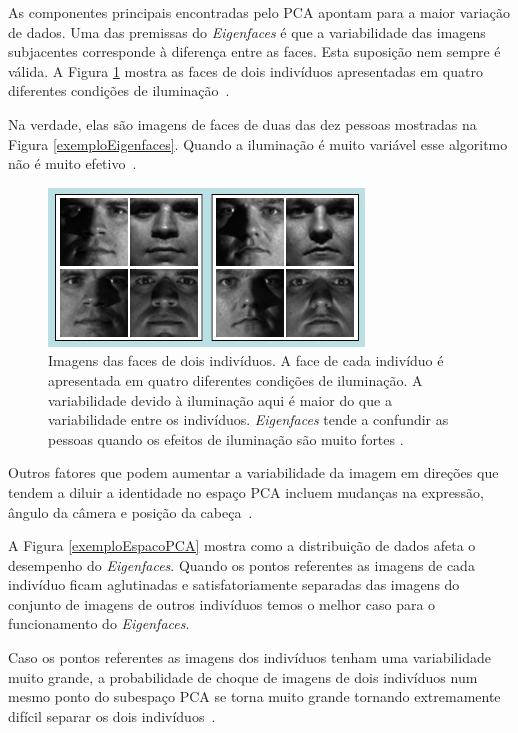 	As componentes principais encontradas pelo PCA apontam para a maior variação de
	dados. Uma das premissas do \textit{Eigenfaces} é que a variabilidade das
	imagens subjacentes corresponde à diferença entre as faces. Esta suposição nem
	sempre é válida. A Figura \ref{exemplosImagensIluminacaoo} mostra as faces de
	dois indivíduos apresentadas em quatro diferentes condições de
	iluminação~\cite{hewitt}.
	
	Na verdade, elas são imagens de faces de duas das dez pessoas mostradas na
	Figura \ref{exemploEigenfaces}. Quando a iluminação é muito variável esse
	algoritmo não é muito efetivo~\cite{hewitt}.

	\begin{figure}[H]
		\begin{center}
			\includegraphics[scale=1.2]{figuras/2.FundamentacaoTeorica/exemplosImagensIluminacaoo.png}
		\end{center}
		\caption{Imagens das faces de dois indivíduos. A face de cada indivíduo é apresentada em quatro diferentes condições de iluminação. A variabilidade devido à iluminação aqui é maior do que a variabilidade entre os indivíduos. \textit{Eigenfaces} tende a confundir as pessoas quando os efeitos de iluminação são muito fortes \cite{hewitt}.}
		\label{exemplosImagensIluminacaoo}
	\end{figure}

	Outros fatores que podem aumentar a variabilidade da imagem em direções que
	tendem a diluir a identidade no espaço PCA incluem mudanças na expressão, ângulo
	da câmera e posição da cabeça~\cite{hewitt}.
	
	A Figura \ref{exemploEspacoPCA} mostra como a distribuição de dados afeta o
	desempenho do \textit{Eigenfaces}. Quando os pontos referentes as imagens de
	cada indivíduo ficam aglutinadas e satisfatoriamente separadas das imagens do conjunto de imagens de outros
	indivíduos temos o melhor caso para o funcionamento do \textit{Eigenfaces}.
	
	Caso os pontos referentes as imagens dos indivíduos tenham uma variabilidade
	muito grande, a probabilidade de choque de imagens de dois indivíduos num mesmo
	ponto do subespaço PCA se torna muito grande tornando extremamente difícil
	separar os dois indivíduos~\cite{hewitt}.
	
